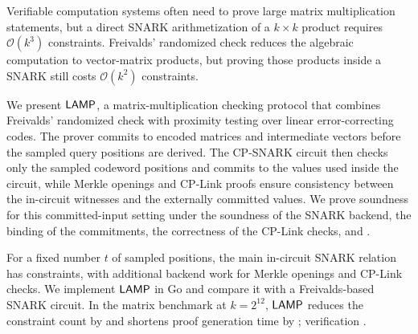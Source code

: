 Verifiable computation systems often need to prove large matrix multiplication
statements, but a direct SNARK arithmetization of a \(k \times k\) product
requires \(\mathcal{O}(k^3)\) constraints. Freivalds' randomized check reduces
the algebraic computation to vector-matrix products, but proving those products
inside a SNARK still costs \(\mathcal{O}(k^2)\) constraints.

We present \(\textsf{LAMP}\), a matrix-multiplication checking protocol that combines
Freivalds' randomized check with proximity testing over linear error-correcting
codes. The prover commits to encoded matrices and intermediate vectors before
the sampled query positions are derived. The CP-SNARK circuit then checks only the sampled codeword positions and commits to the values used inside the circuit, while Merkle openings and CP-Link proofs ensure consistency between the in-circuit witnesses and the externally committed values. We prove soundness for this committed-input setting under the soundness of the SNARK backend, the binding of the commitments, the correctness of the CP-Link checks, and .

For a fixed number \(t\) of sampled positions, the main in-circuit SNARK
relation has  constraints, with additional
 backend work for Merkle openings
and CP-Link checks. We implement \(\textsf{LAMP}\) in Go and compare it with a
Freivalds-based SNARK circuit. In the matrix benchmark at \(k=2^{12}\),
\(\textsf{LAMP}\) reduces the constraint count by \revmath{9.68\times} and shortens proof
generation time by \revmath{5.88\times}; verification 
 .
